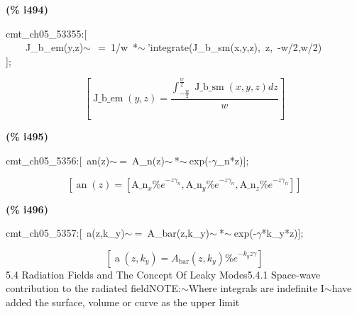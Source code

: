 \documentclass[fleqn]{article}
\begin{document}
\noindent
\begin{minipage}[t]{4.000000em}\color{red}\bfseries
(\% i494)	
\end{minipage}
\begin{minipage}[t]{\textwidth}\color{blue}
cmt\_ch05\_53355:[\\
\ \ \ \ J\_b\_em(y,z)\ensuremath{\sim\ }\ =\ 1/w\ *\ensuremath{\sim\ }'integrate(J\_b\_sm(x,y,z),\ z,\ -w/2,w/2)\\
];
\end{minipage}
\[\displaystyle \tag{\% o494} 
\left[ \operatorname{J\_ b\_ em}\left( y\operatorname{,}z\right) =\frac{\int_{-\frac{w}{2}}^{\frac{w}{2}}{\left. \operatorname{J\_ b\_ sm}\left( x\operatorname{,}y\operatorname{,}z\right) dz\right.}}{w}\right] \mbox{}
\]


\noindent
\begin{minipage}[t]{4.000000em}\color{red}\bfseries
(\% i495)	
\end{minipage}
\begin{minipage}[t]{\textwidth}\color{blue}
cmt\_ch05\_5356:[\ an(z)\ensuremath{\sim\ }=\ A\_n(z)\ensuremath{\sim\ }*\ensuremath{\sim\ }exp(-\ensuremath{\gamma}\_n*z)];
\end{minipage}
\[\displaystyle \tag{\% o495} 
\left[ \operatorname{an}(z)=\left[ {{\ensuremath{\mathrm{A\_ n}}}_x} {{\% e}^{-z {{\gamma }_n}}}\operatorname{,}{{\ensuremath{\mathrm{A\_ n}}}_y} {{\% e}^{-z {{\gamma }_n}}}\operatorname{,}{{\ensuremath{\mathrm{A\_ n}}}_z} {{\% e}^{-z {{\gamma }_n}}}\right] \right] \mbox{}
\]


\noindent
\begin{minipage}[t]{4.000000em}\color{red}\bfseries
(\% i496)	
\end{minipage}
\begin{minipage}[t]{\textwidth}\color{blue}
cmt\_ch05\_5357:[\ a(z,k\_y)\ensuremath{\sim\ }=\ A\_bar(z,k\_y)\ensuremath{\sim\ }*\ensuremath{\sim\ }exp(-\ensuremath{\gamma}*k\_y*z)];
\end{minipage}
\[\displaystyle \tag{\% o496} 
\left[ \operatorname{a}\left( z\operatorname{,}{k_y}\right) ={A_{\ensuremath{\mathrm{bar}}}}\left( z\operatorname{,}{k_y}\right)  {{\% e}^{-{k_y} z \gamma }}\right] \mbox{}
\]
5.4         Radiation Fields and The Concept Of Leaky Modes5.4.1   Space-wave contribution to the radiated fieldNOTE:\ensuremath{\sim }Where integrals are indefinite I\ensuremath{\sim }have added the surface, volume or curve as the upper limit
\end{document}
